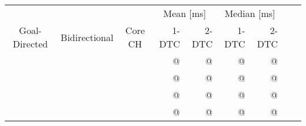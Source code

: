 \begin{tabular}{cccrrrrrr}
	\toprule
	              &               &         & \multicolumn{2}{c}{Mean [\si{\milli\second}]} & \multicolumn{2}{c}{Median [\si{\milli\second}]}                 \\
	Goal-Directed & Bidirectional & Core CH & 1-DTC                                         & 2-DTC                                           & 1-DTC & 2-DTC \\
	\midrule
	\cmark        & \xmark        & \xmark  & @                                             & @                                               & @     & @     \\
	\cmark        & \cmark        & \xmark  & @                                             & @                                               & @     & @     \\
	\xmark        & \cmark        & \cmark  & @                                             & @                                               & @     & @     \\
	\cmark        & \cmark        & \cmark  & @                                             & @                                               & @     & @     \\
	\bottomrule
\end{tabular}